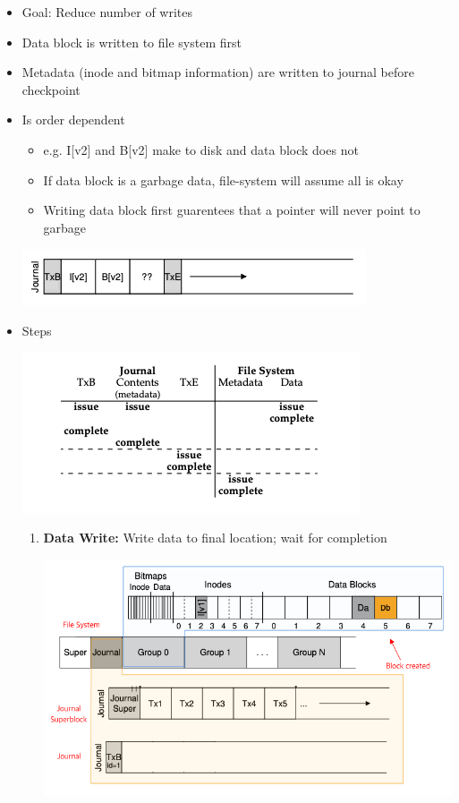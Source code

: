 \documentclass[12pt]{article}
\begin{document}
\begin{itemize}
    \item Goal: Reduce number of writes
    \item Data block is written to file system first
    \item Metadata (inode and bitmap information) are written to journal before checkpoint
    \item Is order dependent
    \begin{itemize}
        \item e.g. I[v2] and B[v2] make to disk and data block does not
        \item If data block is a garbage data, file-system will assume all is okay
        \item Writing data block first guarentees that a pointer will never point to garbage
    \end{itemize}

    \begin{center}
    \includegraphics[width=0.8\linewidth]{../images/midterm_4_solution_40.png}
    \end{center}

    \item Steps

    \begin{center}
    \includegraphics[width=0.8\linewidth]{../images/midterm_4_solution_42.png}
    \end{center}

    \begin{enumerate}[1.]
        \item \textbf{Data Write:} Write data to final location; wait for completion

        \begin{center}
        \includegraphics[width=0.8\linewidth]{../images/midterm_4_solution_43.png}
        \end{center}


\end{enumerate}
\end{itemize}
\end{document}
